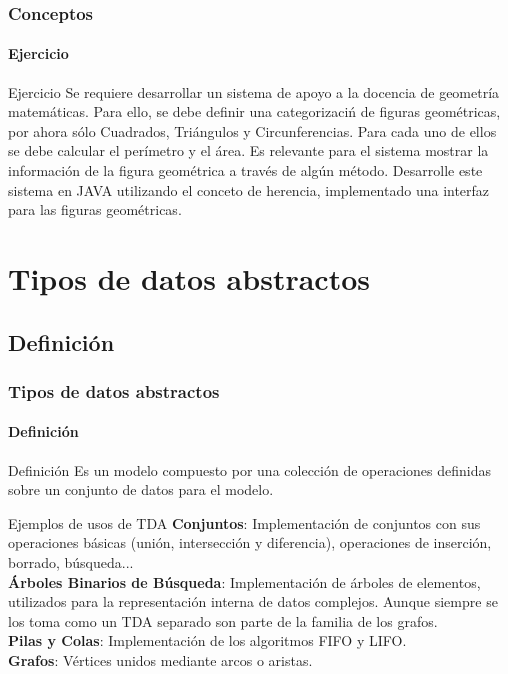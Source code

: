 \documentclass{beamer}
\begin{document}
        \begin{frame}
			\frametitle{Conceptos}
			\framesubtitle{Ejercicio}

			\begin{exampleblock}{Ejercicio}
				Se requiere desarrollar un sistema de apoyo a la docencia de geometr\'ia matem\'aticas. Para ello, se debe definir una categorizaci\'n de figuras geom\'etricas, por ahora s\'olo Cuadrados, Tri\'angulos y Circunferencias. Para cada uno de ellos se debe calcular el per\'imetro y el \'area. Es relevante para el sistema mostrar la informaci\'on de la figura geom\'etrica a trav\'es de alg\'un m\'etodo. Desarrolle este sistema en JAVA utilizando el conceto de herencia, implementado una interfaz para las figuras geom\'etricas.
			\end{exampleblock}
		\end{frame}

	\section{Tipos de datos abstractos}

		\subsection{Definici\'on}

		\begin{frame}
			\frametitle{Tipos de datos abstractos}
			\framesubtitle{Definici\'on}

			\begin{block}{Definici\'on}
				Es un modelo compuesto por una colecci\'on de operaciones definidas sobre un conjunto de datos para el modelo.
			\end{block}
			\begin{block}{Ejemplos de usos de TDA}
				\textbf{Conjuntos}: Implementaci\'on de conjuntos con sus operaciones b\'asicas (uni\'on, intersecci\'on y diferencia), operaciones de inserci\'on, borrado, b\'usqueda...\\
				\textbf{\'Arboles Binarios de B\'usqueda}: Implementaci\'on de \'arboles de elementos, utilizados para la representaci\'on interna de datos complejos. Aunque siempre se los toma como un TDA separado son parte de la familia de los grafos. \\
				\textbf{Pilas y Colas}: Implementaci\'on de los algoritmos FIFO y LIFO. \\
				\textbf{Grafos}: V\'ertices unidos mediante arcos o aristas.
			\end{block}
		\end{frame}
\end{document}
